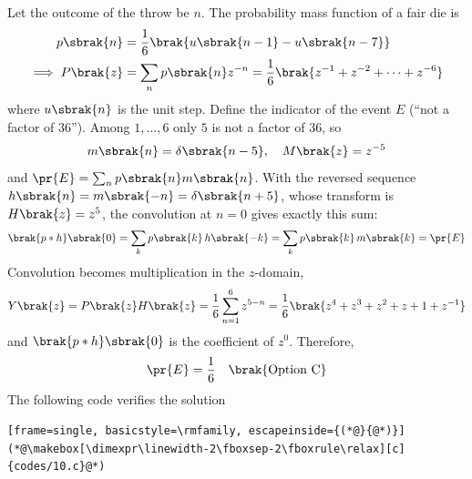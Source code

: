 \begin{enumerate}[label=\thesubsection.\arabic*, ref=\thesubsection.\theenumi]
\solution
Let the outcome of the throw be $n$. The probability mass function of a fair die is
\begin{align}
	p\sbrak{n} &= \frac{1}{6}\brak{u\sbrak{n-1} - u\sbrak{n-7}}
	\\
	\implies P\brak{z} &= \sum_{n} p\sbrak{n}z^{-n} = \frac{1}{6}\brak{z^{-1} + z^{-2} + \cdots + z^{-6}}
\end{align}
where $u\sbrak{n}$ is the unit step. Define the indicator of the event $E$ (``not a factor of $36$''). Among $1,\dots,6$ only $5$ is not a factor of $36$, so
\begin{align}
	m\sbrak{n} = \delta\sbrak{n-5}, \quad M\brak{z} = z^{-5}
\end{align}
and $\pr{E} = \sum_n p\sbrak{n}m\sbrak{n}$. With the reversed sequence $h\sbrak{n} = m\sbrak{-n} = \delta\sbrak{n+5}$, whose transform is $H\brak{z} = z^{5}$, the convolution at $n=0$ gives exactly this sum:
\begin{align}
	\brak{p * h}\sbrak{0} = \sum_{k} p\sbrak{k}\,h\sbrak{-k} = \sum_{k} p\sbrak{k}\,m\sbrak{k} = \pr{E}
\end{align}
Convolution becomes multiplication in the $z$-domain,
\begin{align}
	Y\brak{z} = P\brak{z}H\brak{z} = \frac{1}{6}\sum_{n=1}^{6} z^{5-n}
	= \frac{1}{6}\brak{z^{4} + z^{3} + z^{2} + z + 1 + z^{-1}}
\end{align}
and $\brak{p*h}\sbrak{0}$ is the coefficient of $z^{0}$. Therefore,
\begin{align}
	\pr{E} = \frac{1}{6} \quad \brak{\text{Option C}}
\end{align}
The following code verifies the solution
\begin{lstlisting}[frame=single, basicstyle=\rmfamily, escapeinside={(*@}{@*)}]
(*@\makebox[\dimexpr\linewidth-2\fboxsep-2\fboxrule\relax][c]{codes/10.c}@*)
\end{lstlisting}


\end{enumerate}
